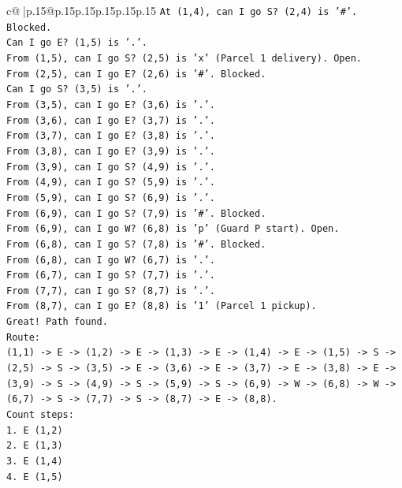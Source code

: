 \documentclass{article}
\begin{document}
{\begin{supertabular}{c@{$\;$}|p{.15\linewidth}@{}p{.15\linewidth}p{.15\linewidth}p{.15\linewidth}p{.15\linewidth}p{.15\linewidth}}
{{{\texttt{At (1,4), can I go S? (2,4) is '\#'. Blocked.} \\
\texttt{Can I go E? (1,5) is '.'.} \\
\texttt{From (1,5), can I go S? (2,5) is 'x' (Parcel 1 delivery). Open.} \\
\texttt{From (2,5), can I go E? (2,6) is '\#'. Blocked.} \\
\texttt{Can I go S? (3,5) is '.'.} \\
\texttt{From (3,5), can I go E? (3,6) is '.'.} \\
\texttt{From (3,6), can I go E? (3,7) is '.'.} \\
\texttt{From (3,7), can I go E? (3,8) is '.'.} \\
\texttt{From (3,8), can I go E? (3,9) is '.'.} \\
\texttt{From (3,9), can I go S? (4,9) is '.'.} \\
\texttt{From (4,9), can I go S? (5,9) is '.'.} \\
\texttt{From (5,9), can I go S? (6,9) is '.'.} \\
\texttt{From (6,9), can I go S? (7,9) is '\#'. Blocked.} \\
\texttt{From (6,9), can I go W? (6,8) is 'p' (Guard P start). Open.} \\
\texttt{From (6,8), can I go S? (7,8) is '\#'. Blocked.} \\
\texttt{From (6,8), can I go W? (6,7) is '.'.} \\
\texttt{From (6,7), can I go S? (7,7) is '.'.} \\
\texttt{From (7,7), can I go S? (8,7) is '.'.} \\
\texttt{From (8,7), can I go E? (8,8) is '1' (Parcel 1 pickup).} \\
\texttt{Great! Path found.} \\
\texttt{Route:} \\
\texttt{(1,1) {-}> E {-}> (1,2) {-}> E {-}> (1,3) {-}> E {-}> (1,4) {-}> E {-}> (1,5) {-}> S {-}> (2,5) {-}> S {-}> (3,5) {-}> E {-}> (3,6) {-}> E {-}> (3,7) {-}> E {-}> (3,8) {-}> E {-}> (3,9) {-}> S {-}> (4,9) {-}> S {-}> (5,9) {-}> S {-}> (6,9) {-}> W {-}> (6,8) {-}> W {-}> (6,7) {-}> S {-}> (7,7) {-}> S {-}> (8,7) {-}> E {-}> (8,8).} \\
\texttt{Count steps:} \\
\texttt{1. E (1,2)} \\
\texttt{2. E (1,3)} \\
\texttt{3. E (1,4)} \\
\texttt{4. E (1,5)} \\
}}}
\end{supertabular}}
\end{document}
